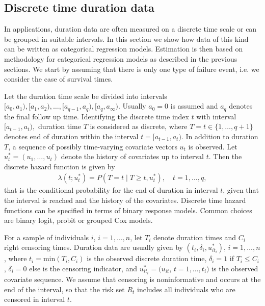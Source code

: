 \documentclass[11pt,a4paper,twoside]{bayesxarticle}
\begin{document}
\subsection{Discrete time duration data}
\label{discretetime}

In applications, duration data are often measured on a discrete time
scale or can be grouped in suitable intervals. In this section we
show how data of this kind can be written as categorical regression
models. Estimation is then based on methodology for categorical
regression models as described in the previous sections. We start by
assuming that there is only one type of failure event, i.e. we
consider the case of survival times.

Let the duration time scale be divided into intervals $\lbrack
a_{0},a_{1}),\lbrack a_{1},a_{2}),\ldots, \lbrack a_{q-1},a_{q}),
\lbrack a_{q},a_{\infty}).$ Usually $a_{0}=0$ is assumed and $a_{q}$
denotes the final follow up time. Identifying the discrete time
index $t$ with interval $\lbrack a_{t-1},a_{t}),$ duration time $T$
is considered as discrete, where $T=t\in \{1,\ldots,q+1\}$ denotes
end of duration within the interval $t=\lbrack a_{t-1},a_{t}).$ In
addition to duration $T$, a sequence of possibly time-varying
covariate vectors $u_t$ is observed. Let
$u_t^*=(u_{1},\ldots,u_{t})$ denote the history of covariates up to
interval $t$. Then the discrete hazard function is given by
\begin{eqnarray*}
\lambda(t;u_t^*)=P(T=t\mid T \geq t,u_t^*), \quad t=1,\ldots,q,
\end{eqnarray*}
that is the conditional probability for the end of duration in
interval $t$, given that the interval is reached and the history of
the covariates. Discrete time hazard functions can be specified in
terms of binary response models. Common choices are binary logit,
probit or grouped Cox models.

For a sample of individuals $i$, $i=1,\ldots,n$, let $T_{i}$ denote
duration times and $C_{i}$ right censoring times. Duration data are
usually given by $(t_{i},\delta_{i},u_{it_{i}}^*)$, $i =
1,\ldots,n$, where $t_{i}=\mbox{min}(T_{i},C_{i})$ is the observed
discrete duration time, $\delta_{i}=1$ if $T_{i}\le C_{i}$,
$\delta_{i}=0$ else is the censoring indicator, and
$u_{it_{i}}^*=(u_{it}$, $t=1,\ldots,t_{i})$ is the observed
covariate sequence. We assume that censoring is noninformative and
occurs at the end of the interval, so that the risk set $R_{t}$
includes all individuals who are censored in interval $t$.
\end{document}
